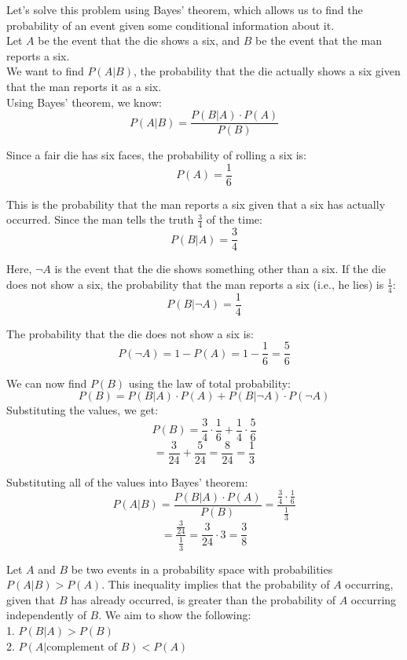 \begin{solution}

    Let's solve this problem using Bayes' theorem, which allows us to find the probability of an event given some conditional information about it.\\

    Let \(A\) be the event that the die shows a six, and \(B\) be the event that the man reports a six.\\
    
    We want to find \(P(A|B)\), the probability that the die actually shows a six given that the man reports it as a six.\\
    
    Using Bayes' theorem, we know:
    \[
    P(A|B) = \frac{P(B|A) \cdot P(A)}{P(B)}
    \]
    
    
    Since a fair die has six faces, the probability of rolling a six is:
       \[
       P(A) = \frac{1}{6}
       \]
    
       This is the probability that the man reports a six given that a six has actually occurred. Since the man tells the truth \( \frac{3}{4} \) of the time:
       \[
       P(B|A) = \frac{3}{4}
       \]
    
       Here, \( \neg A \) is the event that the die shows something other than a six. If the die does not show a six, the probability that the man reports a six (i.e., he lies) is \( \frac{1}{4} \):
       \[
       P(B|\neg A) = \frac{1}{4}
       \]
    
       The probability that the die does not show a six is:
       \[
       P(\neg A) = 1 - P(A) = 1 - \frac{1}{6} = \frac{5}{6}
       \]
    
       We can now find \(P(B)\) using the law of total probability:
       \[
       P(B) = P(B|A) \cdot P(A) + P(B|\neg A) \cdot P(\neg A)
       \]
       Substituting the values, we get:
       \[
       P(B) = \frac{3}{4} \cdot \frac{1}{6} + \frac{1}{4} \cdot \frac{5}{6}
       \]
       \[
       = \frac{3}{24} + \frac{5}{24} = \frac{8}{24} = \frac{1}{3}
       \]
    
       Substituting all of the values into Bayes' theorem:
       \[
       P(A|B) = \frac{P(B|A) \cdot P(A)}{P(B)} = \frac{\frac{3}{4} \cdot \frac{1}{6}}{\frac{1}{3}}
       \]
       \[
       = \frac{\frac{3}{24}}{\frac{1}{3}} = \frac{3}{24} \cdot 3 = \frac{3}{8}
       \]
\end{solution}

\begin{exercise}
    Let \( A \) and \( B \) be two events in a probability space with probabilities \( P(A|B) > P(A) \). This inequality implies that the probability of \( A \) occurring, given that \( B \) has already occurred, is greater than the probability of \( A \) occurring independently of \( B \). We aim to show the following:\\

    1. \( P(B|A) > P(B) \)\\
    2. \( P(A|\text{complement of } B) < P(A) \)
\end{exercise}

